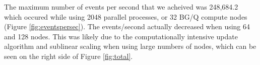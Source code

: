 The maximum number of events per second that we acheived was 248,684.2 which
occured while using 2048 parallel processes, or 32 BG/Q compute nodes (Figure
\ref{fig:eventspersec}). The events/second actually decreased when using 64 and
128 nodes. This was likely due to the computationally intensive update algorithm
and sublinear scaling when using large numbers of nodes, which can be seen on the
right side of Figure \ref{fig:total}.

